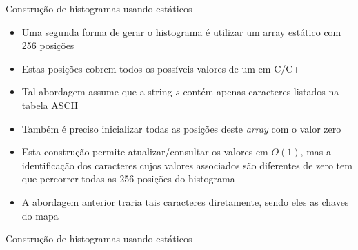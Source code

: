 \begin{frame}[fragile]{Construção de histogramas usando  estáticos}

    \begin{itemize}
        \item Uma segunda forma de gerar o histograma é utilizar um array estático com 256 posições
        \pause

        \item Estas posições cobrem todos os possíveis valores de um  em C/C++
        \pause

        \item Tal abordagem assume que a string $s$ contém apenas caracteres listados na tabela
            ASCII
        \pause

        \item Também é preciso inicializar todas as posições deste \textit{array} com o valor
            zero
        \pause

        \item Esta construção permite atualizar/consultar os valores em $O(1)$, mas a 
            identificação dos caracteres cujos valores associados são diferentes de zero tem
            que percorrer todas as 256 posições do histograma 
        \pause

        \item A abordagem anterior traria tais caracteres diretamente, sendo eles as chaves do mapa
    \end{itemize}

\end{frame}

\begin{frame}[fragile]{Construção de histogramas usando  estáticos}
\end{frame}

